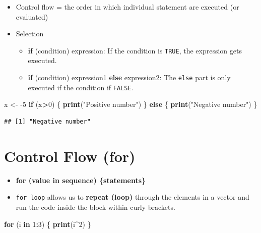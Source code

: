 \documentclass[]{book}
\newenvironment{Shaded}{\begin{snugshade}}{\end{snugshade}}
\newcommand{\ControlFlowTok}[1]{\textcolor[rgb]{0.13,0.29,0.53}{\textbf{#1}}}
\newcommand{\DecValTok}[1]{\textcolor[rgb]{0.00,0.00,0.81}{#1}}
\newcommand{\KeywordTok}[1]{\textcolor[rgb]{0.13,0.29,0.53}{\textbf{#1}}}
\newcommand{\NormalTok}[1]{#1}
\newcommand{\OperatorTok}[1]{\textcolor[rgb]{0.81,0.36,0.00}{\textbf{#1}}}
\newcommand{\StringTok}[1]{\textcolor[rgb]{0.31,0.60,0.02}{#1}}
\providecommand{\tightlist}{%
  \setlength{\itemsep}{0pt}\setlength{\parskip}{0pt}}
\begin{document}
\begin{itemize}
\tightlist
\item
  Control flow = the order in which individual statement are executed (or evaluated)
\item
  Selection

  \begin{itemize}
  \tightlist
  \item
    \textbf{if} (condition) expression: If the condition is \texttt{TRUE}, the expression gets executed.
  \item
    \textbf{if} (condition) expression1 \textbf{else} expression2: The \texttt{else} part is only executed if the condition if \texttt{FALSE}.
  \end{itemize}
\end{itemize}

\begin{Shaded}
\begin{Highlighting}[]
\NormalTok{x <-}\StringTok{ }\DecValTok{-5}
\ControlFlowTok{if}\NormalTok{ (x}\OperatorTok{>}\DecValTok{0}\NormalTok{) \{}
  \KeywordTok{print}\NormalTok{(}\StringTok{"Positive number"}\NormalTok{)}
\NormalTok{\} }\ControlFlowTok{else}\NormalTok{ \{}
  \KeywordTok{print}\NormalTok{(}\StringTok{"Negative number"}\NormalTok{)}
\NormalTok{\}}
\end{Highlighting}
\end{Shaded}

\begin{verbatim}
## [1] "Negative number"
\end{verbatim}

\hypertarget{control-flow-for}{%
\section{Control Flow (for)}\label{control-flow-for}}

\begin{itemize}
\tightlist
\item
  \textbf{for (value in sequence) \{statements\}}
\item
  \texttt{for\ loop} allows us to \textbf{repeat (loop)} through the elements in a vector and run the code inside the block within curly brackets.
\end{itemize}

\begin{Shaded}
\begin{Highlighting}[]
\ControlFlowTok{for}\NormalTok{ (i }\ControlFlowTok{in} \DecValTok{1}\OperatorTok{:}\DecValTok{3}\NormalTok{) \{}
  \KeywordTok{print}\NormalTok{(i}\OperatorTok{^}\DecValTok{2}\NormalTok{)}
\NormalTok{\}}
\end{Highlighting}
\end{Shaded}
\end{document}
